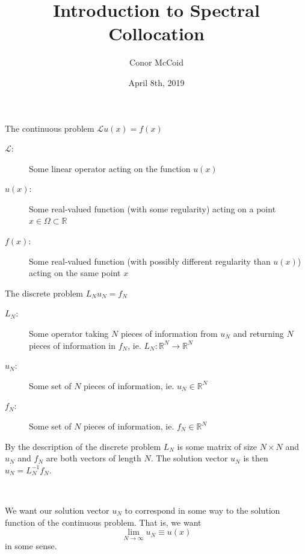 \documentclass{beamer}
\title{Introduction to Spectral Collocation}
\author{Conor McCoid}
\institute{University of Geneva}
\date{April 8th, 2019}
\begin{document}
\frame{\titlepage}

\begin{frame}

\begin{block}{The continuous problem}
$\mathcal{L} u(x) = f(x)$
\end{block}

\begin{description}
\item[$\mathcal{L}$:] Some linear operator acting on the function $u(x)$
\item[$u(x)$:] Some real-valued function (with some regularity) acting on a point $x \in \Omega \subset \mathbb{R}$
\item[$f(x)$:] Some real-valued function (with possibly different regularity than $u(x)$) acting on the same point $x$
\end{description}

\end{frame}

\begin{frame}

\begin{block}{The discrete problem}
$L_N u_N = f_N$
\end{block}

\begin{description}
\item[$L_N$:] Some operator taking $N$ pieces of information from $u_N$ and returning $N$ pieces of information in $f_N$, ie. $L_N : \mathbb{R}^N \rightarrow \mathbb{R}^N$
\item[$u_N$:] Some set of $N$ pieces of information, ie. $u_N \in \mathbb{R}^N$
\item[$f_N$:] Some set of $N$ pieces of information, ie. $f_N \in \mathbb{R}^N$
\end{description}

\end{frame}

\begin{frame}

By the description of the discrete problem $L_N$ is some matrix of size $N \times N$ and $u_N$ and $f_N$ are both vectors of length $N$.
The solution vector $u_N$ is then $u_N = L_N^{-1} f_N$.

~

We want our solution vector $u_N$ to correspond in some way to the solution function of the continuous problem.
That is, we want
\begin{equation*}
\lim_{N \to \infty} u_N \equiv u(x)
\end{equation*}
in some sense.

\end{frame}
\end{document}
